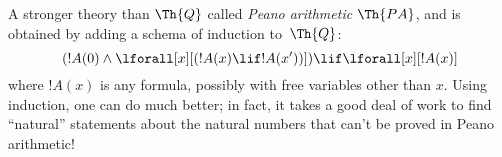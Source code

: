 \documentclass[../../include/open-logic-section]{subfiles}
\begin{document}

A stronger theory than $\Th{Q}$ called \emph{Peano arithmetic} $\Th{PA}$, and
is obtained by adding a schema of induction to~$\Th{Q}$:
\[
(!A(0) \land \lforall[x][(!A(x) \lif !A(x'))]) \lif \lforall[x][!A(x)]
\]
where $!A(x)$ is any formula, possibly with free variables other than
$x$.  Using induction, one can do much better; in fact, it takes a
good deal of work to find ``natural'' statements about the natural
numbers that can't be proved in Peano arithmetic!
\end{document}
